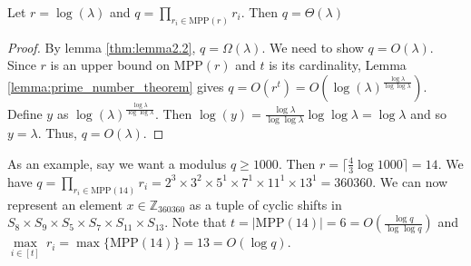 \begin{theorem}\label{thm:choosing_modulus}
    Let $r = \log(\lambda)$ and $q = \underset{r_i \in \text{MPP}(r)}{\prod} r_i$. Then $q = \Theta(\lambda)$
\end{theorem}
\begin{proof}
    By lemma \ref{thm:lemma2.2}, $q = \Omega(\lambda)$. We need to show $q = O(\lambda)$.
    Since $r$ is an upper bound on $\text{MPP}(r)$ and $t$ is its cardinality, Lemma \ref{lemma:prime_number_theorem} gives $q = O(r^t) = O(\log(\lambda)^{\frac{\log\lambda}{\log\log \lambda}})$.
    Define $y$ as $\log(\lambda)^{\frac{\log\lambda}{\log\log \lambda}}$. Then $\log(y) = \frac{\log\lambda}{\log\log \lambda} \log\log\lambda = \log\lambda$ and so $y = \lambda$. Thus, $q = O(\lambda)$. 
\end{proof}

As an example, say we want a modulus $q \geq 1000$. Then $r = \lceil \frac{4}{3} \log 1000 \rceil = 14$. We have $q = \underset{r_i \in \text{MPP}(14)}{\prod} r_i = 2^3 \times 3^2 \times 5^1 \times 7^1 \times 11^1 \times 13^1 = 360360$. We can now represent an element $x \in \mathbb{Z}_{360360}$ as a tuple of cyclic shifts in $S_8 \times S_9 \times S_5 \times S_7 \times S_{11} \times S_{13}$. Note that $t = |\text{MPP}(14)| = 6 = O(\frac{\log q}{\log \log q})$ and $\underset{i \in [t]}{\max} \ r_i = \max\{\text{MPP}(14)\} = 13 = O(\log q)$.